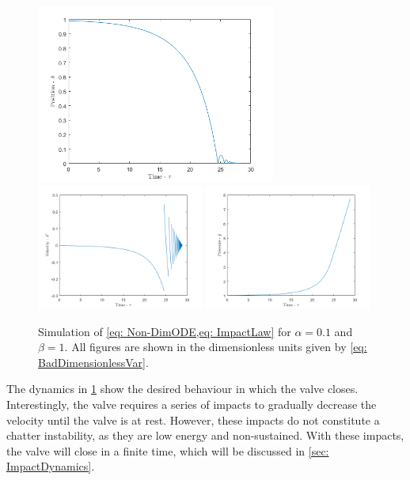 \begin{figure}[!ht]
    \centering
    \includegraphics[width=0.7\textwidth]{Figures/Example/PositionTimeTrajectory.png}
    \includegraphics[width=0.49\textwidth]{Figures/Example/VelocityTimeTrajectory.png}
    \includegraphics[width=0.49\textwidth]{Figures/Example/PressureTimeTrajectory.png}
    \caption{Simulation of \cref{eq: Non-DimODE,eq: ImpactLaw} for $\alpha = 0.1$ and $\beta = 1$. All figures are shown in the dimensionless units given by \cref{eq: BadDimensionlessVar}.}
    \label{fig:TimeTrajec}
\end{figure}

The dynamics in \cref{fig:TimeTrajec} show the desired behaviour in which the valve closes. Interestingly, the valve requires a series of impacts to gradually decrease the velocity until the valve is at rest. However, these impacts do not constitute a chatter instability, as they are low energy and non-sustained. With these impacts, the valve will close in a finite time, which will be discussed in \cref{sec: ImpactDynamics}.

